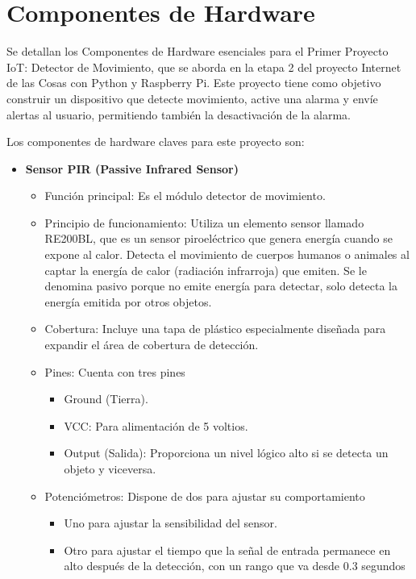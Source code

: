 \documentclass{report}
\begin{document}
\section{Componentes de Hardware}
Se detallan los Componentes de Hardware esenciales para el Primer Proyecto IoT: Detector de Movimiento, que se aborda en la etapa 2 del proyecto 
Internet de las Cosas con Python y Raspberry Pi. Este proyecto tiene como objetivo construir un dispositivo que detecte movimiento, 
active una alarma y envíe alertas al usuario, permitiendo también la desactivación de la alarma.

Los componentes de hardware claves para este proyecto son:
\begin{itemize}
    \item \textbf{Sensor PIR (Passive Infrared Sensor)}
    \begin{itemize}
        \item Función principal: Es el módulo detector de movimiento.
        \item Principio de funcionamiento: Utiliza un elemento sensor llamado RE200BL, que es un sensor piroeléctrico que genera energía cuando se 
        expone al calor. Detecta el movimiento de cuerpos humanos o animales al captar la energía de calor (radiación infrarroja) que emiten. Se le 
        denomina pasivo porque no emite energía para detectar, solo detecta la energía emitida por otros objetos.
        \item Cobertura: Incluye una tapa de plástico especialmente diseñada para expandir el área de cobertura de detección.
        \item Pines: Cuenta con tres pines
        \begin{itemize}
            \item Ground (Tierra).
            \item VCC: Para alimentación de 5 voltios.
            \item Output (Salida): Proporciona un nivel lógico alto si se detecta un objeto y viceversa.
        \end{itemize}
        \item Potenciómetros: Dispone de dos para ajustar su comportamiento
        \begin{itemize}
            \item Uno para ajustar la sensibilidad del sensor.
            \item Otro para ajustar el tiempo que la señal de entrada permanece en alto después de la detección, con un rango que va desde 0.3 segundos 

\end{itemize}
\end{itemize}
\end{itemize}
\end{document}
